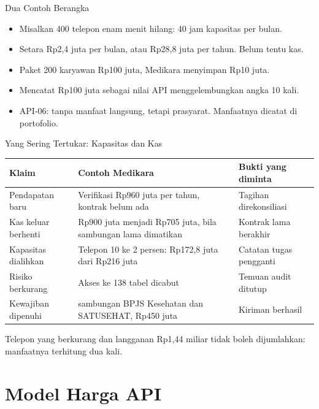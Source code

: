 \documentclass[aspectratio=169, table, 12pt]{beamer}
\begin{document}
\begin{frame}{{\Large Dua Contoh Berangka}}
  \vspace{8pt}
  \begin{itemize}
    \item Misalkan 400 telepon enam menit hilang: 40 jam kapasitas per bulan.
    \item Setara Rp2,4 juta per bulan, atau Rp28,8 juta per tahun. Belum tentu kas.
    \item Paket 200 karyawan Rp100 juta, Medikara menyimpan Rp10 juta.
    \item Mencatat Rp100 juta sebagai nilai API menggelembungkan angka 10 kali.
    \item API-06: tanpa manfaat langsung, tetapi prasyarat. Manfaatnya dicatat di portofolio.
  \end{itemize}
\end{frame}

\begin{frame}{{\Large Yang Sering Tertukar: Kapasitas dan Kas}}
  \footnotesize
  \begin{tabularx}{\textwidth}{>{\raggedright\arraybackslash}p{2.6cm} >{\raggedright\arraybackslash}X >{\raggedright\arraybackslash}p{3.6cm}}
    \hline
    \textbf{Klaim} & \textbf{Contoh Medikara} & \textbf{Bukti yang diminta} \\ \hline
    Pendapatan baru & Verifikasi Rp960 juta per tahun, kontrak belum ada & Tagihan direkonsiliasi \\ \hline
    Kas keluar berhenti & Rp900 juta menjadi Rp705 juta, bila sambungan lama dimatikan & Kontrak lama berakhir \\ \hline
    Kapasitas dialihkan & Telepon 10 ke 2 persen: Rp172,8 juta dari Rp216 juta & Catatan tugas pengganti \\ \hline
    Risiko berkurang & Akses ke 138 tabel dicabut & Temuan audit ditutup \\ \hline
    Kewajiban dipenuhi & 10 sambungan BPJS Kesehatan dan SATUSEHAT, Rp450 juta & Kiriman berhasil \\ \hline
  \end{tabularx}

  \vspace{8pt}
  \small Telepon yang berkurang dan langganan Rp1,44 miliar tidak boleh dijumlahkan: manfaatnya terhitung dua kali.
\end{frame}

\section{Model Harga API}
\end{document}
